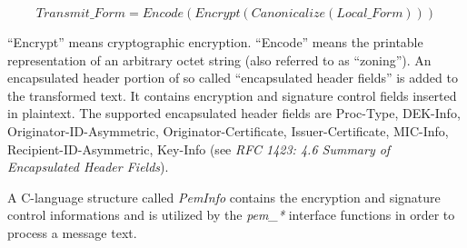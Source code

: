 \begin{displaymath}
Transmit\_Form=Encode(Encrypt(Canonicalize(Local\_Form)))
\end{displaymath}

``Encrypt'' means cryptographic encryption.
``Encode'' means the printable representation of an arbitrary octet string
(also referred to as ``zoning'').
An encapsulated header portion of so called ``encapsulated header fields''
is added to the transformed text.
It contains encryption and signature control fields inserted in plaintext.
The supported encapsulated header fields are
Proc-Type, DEK-Info, Originator-ID-Asymmetric,
Originator-Certificate, Issuer-Certificate, MIC-Info,
Recipient-ID-Asymmetric, Key-Info (see {\em RFC 1423: 4.6 Summary of
Encapsulated Header Fields}).

A C-language structure called {\em PemInfo}
contains the encryption and signature control informations
and is utilized by the {\em pem\_*} interface functions
in order to process a message text.

